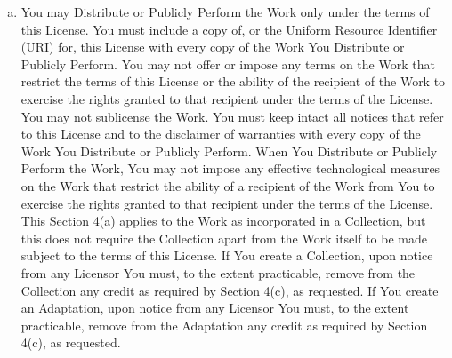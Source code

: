 \begin{enumerate}[a.]
          \item You may Distribute or Publicly Perform the Work only
          under the terms of this License. You must include a copy
          of, or the Uniform Resource Identifier (URI) for, this
          License with every copy of the Work You Distribute or
          Publicly Perform. You may not offer or impose any terms
          on the Work that restrict the terms of this License or
          the ability of the recipient of the Work to exercise the
          rights granted to that recipient under the terms of the
          License. You may not sublicense the Work. You must keep
          intact all notices that refer to this License and to the
          disclaimer of warranties with every copy of the Work You
          Distribute or Publicly Perform. When You Distribute or
          Publicly Perform the Work, You may not impose any
          effective technological measures on the Work that
          restrict the ability of a recipient of the Work from You
          to exercise the rights granted to that recipient under
          the terms of the License. This Section 4(a) applies to
          the Work as incorporated in a Collection, but this does
          not require the Collection apart from the Work itself to
          be made subject to the terms of this License. If You
          create a Collection, upon notice from any Licensor You
          must, to the extent practicable, remove from the
          Collection any credit as required by Section 4(c), as
          requested. If You create an Adaptation, upon notice from
          any Licensor You must, to the extent practicable, remove
          from the Adaptation any credit as required by Section
          4(c), as requested.


\end{enumerate}

